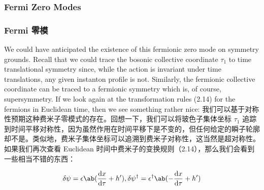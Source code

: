 \documentclass{ctexart}
\begin{document}
\begin{paracol}{2}
\subsubsection{Fermi Zero Modes}
\switchcolumn
\subsubsection*{Fermi 零模}
\switchcolumn*

We could have anticipated the existence of this fermionic zero mode on symmetry grounds. Recall that we could trace the bosonic collective coordinate $\tau_1$ to time translational symmetry since, while the action is invariant under time translations, any given instanton profile is not. Similarly, the fermionic collective coordinate can be traced to a fermionic symmetry which is, of course, supersymmetry. If we look again at the transformation rules (2.14) for the fermions in Euclidean time, then we see something rather nice:
\switchcolumn
我们可以基于对称性预期这种费米子零模式的存在。回想一下，我们可以将玻色子集体坐标 $\tau_1$ 追踪到时间平移对称性，因为虽然作用在时间平移下是不变的，但任何给定的瞬子轮廓却不是。类似地，费米子集体坐标可以追溯到费米子对称性，这当然是超对称性。如果我们再次查看 Euclidean 时间中费米子的变换规则（2.14），那么我们会看到一些相当不错的东西：
\end{paracol}

\[ \delta \psi = \epsilon \ab(\odv{x}{\tau} + h'), \delta \psi^{\dagger} = \epsilon^{\dagger} \ab(- \odv{x}{\tau} + h') \]
\end{document}
